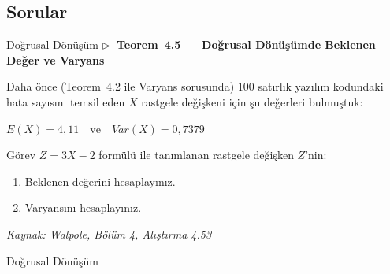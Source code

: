 ﻿\documentclass[light]{lutbeamer}
\begin{document}
\subsection{Sorular}

\begin{frame}{Doğrusal Dönüşüm}
  \textbf{\small $\triangleright$~Teorem~4.5 --- Doğrusal Dönüşümde Beklenen Değer ve Varyans}

  \smallskip
  \small
  Daha önce (Teorem~4.2 ile Varyans sorusunda) 100 satırlık yazılım kodundaki hata sayısını temsil eden $X$ rastgele değişkeni için şu değerleri bulmuştuk:
  \begin{center}
    $E(X) = 4{,}11 \quad \text{ve} \quad Var(X) = 0{,}7379$
  \end{center}

  \begin{block}{Görev}
    $Z = 3X - 2$ formülü ile tanımlanan rastgele değişken $Z$'nin:
    \begin{enumerate}
      \item[(a)] Beklenen değerini hesaplayınız.
      \item[(b)] Varyansını hesaplayınız.
    \end{enumerate}
  \end{block}
  \vspace{0.2cm}
  {\footnotesize \textit{Kaynak: Walpole, Bölüm 4, Alıştırma 4.53 \cite{walpole_ch4}}}
\end{frame}

\begin{frame}{Doğrusal Dönüşüm}
\end{frame}
\end{document}
